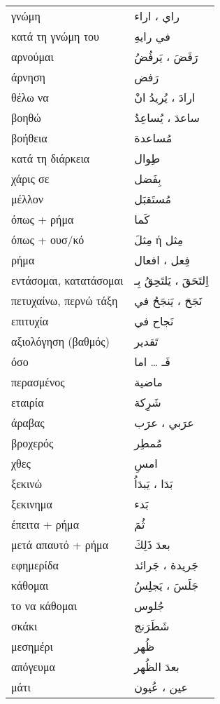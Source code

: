 \documentclass[twocolumn,a4paper]{article}
\newcommand{\ar}[1]{\textarabic{#1}}
\newcommand{\pl}{\raisebox{0.15ex}{\footnotesize ◍}}
\newcommand{\vrf}{\raisebox{0.15ex}{\footnotesize ◉}}
\newcommand{\mas}{\raisebox{0.15ex}{\footnotesize ◫}}
\begin{document}
\begin{mpsupertabular}{ P{0.5\textwidth} P{0.5\textwidth} }
γνώμη \pl      & \ar{ راي ، اراء } \\
κατά τη γνώμη του & \ar{ في رايهِ } \\
αρνούμαι \vrf  & \ar{ رَفَضَ ، يَرفُضُ } \\
άρνηση \mas    & \ar{ رَفض } \\
θέλω να \vrf   & \ar{ ارادَ ، يُريدُ انْ } \\
βοηθώ \vrf     & \ar{ ساعدَ ، يُساعِدُ } \\
βοήθεια \mas   & \ar{ مُساعدة } \\
κατά τη διάρκεια & \ar{ طِوال } \\
χάρις σε       & \ar{ بِفَضل } \\
μέλλον         & \ar{ مُستَقبَل } \\
όπως + ρήμα    & \ar{ كَما } \\
όπως + ουσ/κό  & \ar{ مِثلَ } ή \ar{ مِثل } \\
ρήμα  \pl      & \ar{ فِعل ، افعال } \\
εντάσομαι, κατατάσομαι \vrf & \ar{ اِلتَحَقَ ، يَلتَحِقُ بِـ } \\
πετυχαίνω, περνώ τάξη \vrf & \ar{ نَجَحَ ، يَنجَحُ في } \\
επιτυχία \mas  & \ar{ نَجاح في } \\
αξιολόγηση (βαθμός)  & \ar{ تَقدير } \\
όσο            & \ar{ فَـ } \ldots \ar{ اما } \\
περασμένος     & \ar{ ماضية } \\
εταιρία        & \ar{ شَرِكة } \\

άραβας \pl     & \ar{ عرَبي ، عرَب } \\
βροχερός       & \ar{ مُمطِر } \\
χθες           & \ar{ امسِ } \\
ξεκινώ \vrf    & \ar{ بَدَا ، يَبدَاُ } \\
ξεκινημα \mas  & \ar{ بَدء } \\
έπειτα + ρήμα       & \ar{ ثُمَ } \\
μετά απαυτό + ρήμα  & \ar{ بعدَ ذَلِكَ } \\
εφημερίδα \pl  & \ar{ جَريدة ، جَرائد } \\
κάθομαι \vrf   & \ar{ جَلَسَ ، يَجلِسُ } \\
το να κάθομαι \mas & \ar{ جُلوس } \\
σκάκι          & \ar{ شَطَرَنج } \\
μεσημέρι       & \ar{ ظُهر } \\
απόγευμα       & \ar{ بعدَ الظُهر } \\
μάτι \pl       & \ar{ عين ، عُيون } \\


\end{mpsupertabular}
\end{document}
